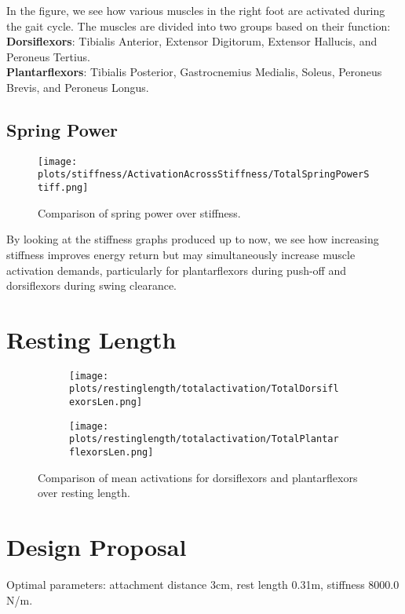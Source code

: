 \documentclass[12pt]{article}
\begin{document}
In the figure, we see how various muscles in the right foot are activated during the gait cycle. The muscles are divided into two groups based on their function:\\
\textbf{Dorsiflexors}: Tibialis Anterior, Extensor Digitorum, Extensor Hallucis, and Peroneus Tertius.\\
\textbf{Plantarflexors}: Tibialis Posterior, Gastrocnemius Medialis, Soleus, Peroneus Brevis, and Peroneus Longus.\\

\subsection*{Spring Power}

\begin{figure}[H]
    \centering
    \texttt{[image: plots/stiffness/ActivationAcrossStiffness/TotalSpringPowerStiff.png]}
    \caption{Comparison of spring power over stiffness.}
\end{figure}

By looking at the stiffness graphs produced up to now, we see how increasing stiffness improves energy return but may simultaneously increase muscle activation demands, particularly for plantarflexors during push-off and dorsiflexors during swing clearance.

\section*{Resting Length}

\begin{figure}[H]
    \centering
    \begin{subfigure}[b]{0.42\textwidth}
        \texttt{[image: plots/restinglength/totalactivation/TotalDorsiflexorsLen.png]}
    \end{subfigure}
    \hfill
    \begin{subfigure}[b]{0.42\textwidth}
        \texttt{[image: plots/restinglength/totalactivation/TotalPlantarflexorsLen.png]}
    \end{subfigure}
    \caption{Comparison of mean activations for dorsiflexors and plantarflexors over resting length.}
\end{figure}

\section*{Design Proposal}

Optimal parameters: attachment distance 3cm, rest length  0.31m, stiffness 8000.0 N/m.
\end{document}
